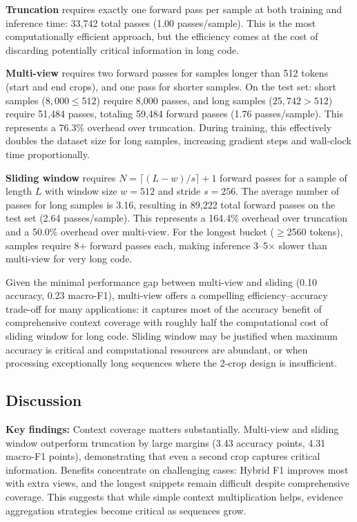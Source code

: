 \documentclass[conference]{IEEEtran}
\begin{document}
\textbf{Truncation} requires exactly one forward pass per sample at both training and inference time: 33,742 total passes (1.00 passes/sample). This is the most computationally efficient approach, but the efficiency comes at the cost of discarding potentially critical information in long code.

\textbf{Multi-view} requires two forward passes for samples longer than 512 tokens (start and end crops), and one pass for shorter samples. On the test set: short samples ($8{,}000 \leq 512$) require 8,000 passes, and long samples ($25{,}742 > 512$) require 51,484 passes, totaling 59,484 forward passes (1.76 passes/sample). This represents a 76.3\% overhead over truncation. During training, this effectively doubles the dataset size for long samples, increasing gradient steps and wall-clock time proportionally.

\textbf{Sliding window} requires $N = \lceil (L - w) / s \rceil + 1$ forward passes for a sample of length $L$ with window size $w{=}512$ and stride $s{=}256$. The average number of passes for long samples is 3.16, resulting in 89,222 total forward passes on the test set (2.64 passes/sample). This represents a 164.4\% overhead over truncation and a 50.0\% overhead over multi-view. For the longest bucket ($\geq$2560 tokens), samples require 8+ forward passes each, making inference 3--5$\times$ slower than multi-view for very long code.

Given the minimal performance gap between multi-view and sliding (0.10 accuracy, 0.23 macro-F1), multi-view offers a compelling efficiency--accuracy trade-off for many applications: it captures most of the accuracy benefit of comprehensive context coverage with roughly half the computational cost of sliding window for long code. Sliding window may be justified when maximum accuracy is critical and computational resources are abundant, or when processing exceptionally long sequences where the 2-crop design is insufficient.

\subsection{Discussion}

\textbf{Key findings:} Context coverage matters substantially. Multi-view and sliding window outperform truncation by large margins (3.43 accuracy points, 4.31 macro-F1 points), demonstrating that even a second crop captures critical information. Benefits concentrate on challenging cases: Hybrid F1 improves most with extra views, and the longest snippets remain difficult despite comprehensive coverage. This suggests that while simple context multiplication helps, evidence aggregation strategies become critical as sequences grow.
\end{document}
